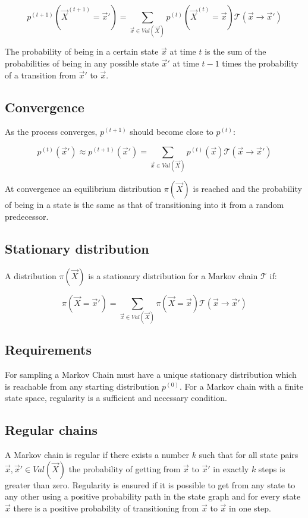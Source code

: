 	$$p^{(t+1)}(\vec{X}^{(t+1)} = \vec{x}') = \sum\limits_{\vec{x}\in Val(\vec{X})}p^{(t)}(\vec{X}^{(t)} = \vec{x})\mathcal{T}(\vec{x}\rightarrow\vec{x}')$$

	The probability of being in a certain state $\vec{x}$ at time $t$ is the sum of the probabilities of being in any possible state $\vec{x}'$ at time $t-1$ times the probability of a transition from $\vec{x}'$ to $\vec{x}$.

	\subsection{Convergence}
	As the process converges, $p^{(t+1)}$ should become close to $p^{(t)}$:

	$$p^{(t)}(\vec{x}')\approx p^{(t+1)}(\vec{x}') = \sum\limits_{\vec{x}\in Val(\vec{X})}p^{(t)}(\vec{x})\mathcal{T}(\vec{x}\rightarrow\vec{x}')$$

	At convergence an equilibrium distribution $\pi(\vec{X})$ is reached and the probability of being in a state is the same as that of transitioning into it from a random predecessor.

	\subsection{Stationary distribution}
	A distribution $\pi(\vec{X})$ is a stationary distribution for a Markov chain $\mathcal{T}$ if:

	$$\pi(\vec{X}=\vec{x}') = \sum\limits_{\vec{x}\in Val(\vec{X})}\pi(\vec{X} = \vec{x})\mathcal{T}(\vec{x}\rightarrow\vec{x}')$$

	\subsection{Requirements}
	For sampling a Markov Chain must have a unique stationary distribution which is reachable from any starting distribution $p^{(0)}$.
	For a Markov chain with a finite state space, regularity is a sufficient and necessary condition.

	\subsection{Regular chains}
	A Markov chain is regular if there exists a number $k$ such that for all state pairs $\vec{x},\vec{x}'\in Val(\vec{X})$ the probability of getting from $\vec{x}$ to $\vec{x}'$ in exactly $k$ steps is greater than zero.
	Regularity is ensured if it is possible to get from any state to any other using a positive probability path in the state graph and for every state $\vec{x}$ there is a positive probability of transitioning from $\vec{x}$ to $\vec{x}$ in one step.

